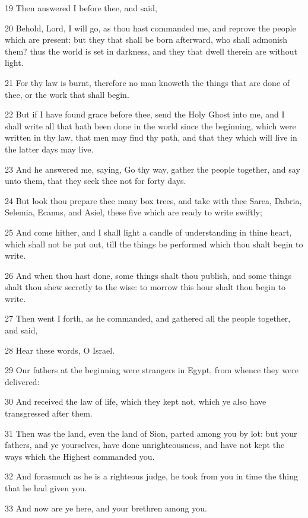 \par 19 Then answered I before thee, and said,
\par 20 Behold, Lord, I will go, as thou hast commanded me, and reprove the people which are present: but they that shall be born afterward, who shall admonish them? thus the world is set in darkness, and they that dwell therein are without light.
\par 21 For thy law is burnt, therefore no man knoweth the things that are done of thee, or the work that shall begin.
\par 22 But if I have found grace before thee, send the Holy Ghost into me, and I shall write all that hath been done in the world since the beginning, which were written in thy law, that men may find thy path, and that they which will live in the latter days may live.
\par 23 And he answered me, saying, Go thy way, gather the people together, and say unto them, that they seek thee not for forty days.
\par 24 But look thou prepare thee many box trees, and take with thee Sarea, Dabria, Selemia, Ecanus, and Asiel, these five which are ready to write swiftly;
\par 25 And come hither, and I shall light a candle of understanding in thine heart, which shall not be put out, till the things be performed which thou shalt begin to write.
\par 26 And when thou hast done, some things shalt thou publish, and some things shalt thou shew secretly to the wise: to morrow this hour shalt thou begin to write.
\par 27 Then went I forth, as he commanded, and gathered all the people together, and said,
\par 28 Hear these words, O Israel.
\par 29 Our fathers at the beginning were strangers in Egypt, from whence they were delivered:
\par 30 And received the law of life, which they kept not, which ye also have transgressed after them.
\par 31 Then was the land, even the land of Sion, parted among you by lot: but your fathers, and ye yourselves, have done unrighteousness, and have not kept the ways which the Highest commanded you.
\par 32 And forasmuch as he is a righteous judge, he took from you in time the thing that he had given you.
\par 33 And now are ye here, and your brethren among you.
